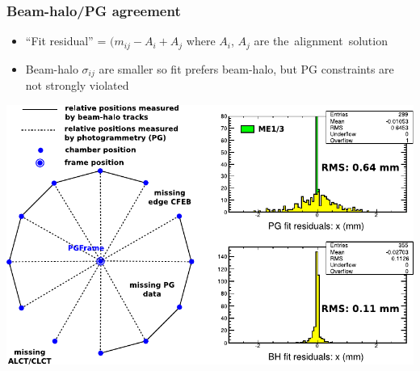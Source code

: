 \documentclass[compress]{beamer}
\begin{document}
\begin{frame}
\frametitle{Beam-halo/PG agreement}

\begin{itemize}
\item ``Fit residual'' = $(m_{ij} - A_i + A_j$ where $A_i$, $A_j$ are \mbox{the alignment solution\hspace{-1 cm}}
\item Beam-halo $\sigma_{ij}$ are smaller so fit prefers beam-halo, but PG constraints are not strongly violated
\end{itemize}

\includegraphics[width=0.9\linewidth]{beamhalo-PG.pdf}
\end{frame}
\end{document}
